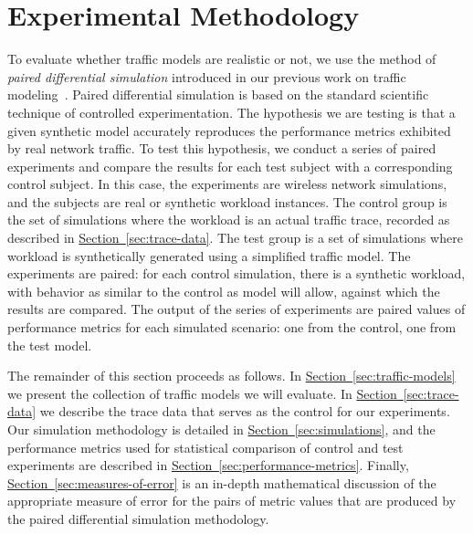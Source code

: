 \documentclass[twocolumn,final]{svjour3}
\newcommand{\Section}[1]{\hyperref[sec:#1]{Section~\ref*{sec:#1}}}
\begin{document}
\section{Experimental Methodology}
\label{sec:methodology}

To evaluate whether traffic models are realistic or not, we use the method of \textit{paired differential simulation} introduced in our previous work on traffic modeling~\cite{Karpinski07:realism,Karpinski07:cbr-failure}. %
%
%
Paired differential simulation is based on the standard scientific technique of controlled experimentation. 
The hypothesis we are testing is that a given synthetic model accurately reproduces the performance metrics exhibited by real network traffic. To test this hypothesis, we conduct a series of paired experiments and compare the results for each test subject with a corresponding control subject. In this case, the experiments are wireless network simulations, and the subjects are real or synthetic workload instances. The control group is the set of simulations where the workload is an actual traffic trace, recorded as described in \Section{trace-data}. The test group is a set of simulations where workload is synthetically generated using a simplified traffic model. The experiments are paired: for each control simulation, there is a synthetic workload, with behavior as similar to the control as model will allow, against which the results are compared. The output of the series of experiments are paired values of performance metrics for each simulated scenario: one from the control, one from the test model.

The remainder of this section proceeds as follows. In \Section{traffic-models} we present the collection of traffic models we will evaluate. In \Section{trace-data} we describe the trace data that serves as the control for our experiments. Our simulation methodology is detailed in \Section{simulations}, and the performance metrics used for statistical comparison of control and test experiments are described in \Section{performance-metrics}. Finally, \Section{measures-of-error} is an in-depth mathematical discussion of the appropriate measure of error for the pairs of metric values that are produced by the paired differential simulation methodology.
\end{document}

